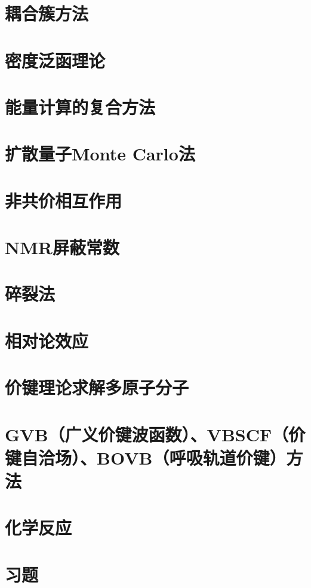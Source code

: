 \documentclass{book}
\begin{document}
	\section{耦合簇方法}
	
	\section{密度泛函理论}
	
	\section{能量计算的复合方法}
	
	\section{扩散量子Monte Carlo法}
	
	\section{非共价相互作用}
	
	\section{NMR屏蔽常数}
	
	\section{碎裂法}
	
	\section{相对论效应}
	
	\section{价键理论求解多原子分子}
	
	\section{GVB（广义价键波函数）、VBSCF（价键自洽场）、BOVB（呼吸轨道价键）方法}
	
	\section{化学反应}
	
	\section*{习题}
	
\end{document}
